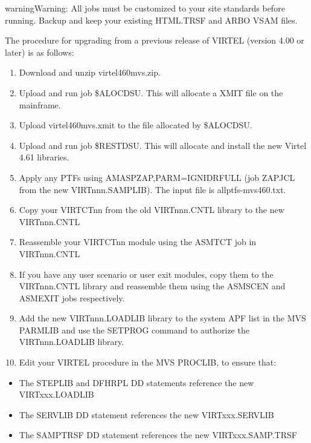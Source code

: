 \documentclass[letterpaper,10pt,english]{sphinxmanual}
\begin{document}
\begin{sphinxadmonition}{warning}{Warning:}
All jobs must be customized to your site standards before running. Backup and keep your existing HTML.TRSF and ARBO VSAM files.
\end{sphinxadmonition}

The procedure for upgrading from a previous release of VIRTEL (version 4.00 or later) is as follows:
\begin{enumerate}
\def\theenumi{\arabic{enumi}}
\def\labelenumi{\theenumi .}
\makeatletter\def\p@enumii{\p@enumi \theenumi .}\makeatother
\item {} 
Download and unzip virtel460mvs.zip.

\item {} 
Upload and run job \$ALOCDSU. This will allocate a XMIT file on the mainframe.

\item {} 
Upload virtel460mvs.xmit to the file allocated by \$ALOCDSU.

\item {} 
Upload and run job \$RESTDSU. This will allocate and install the new Virtel 4.61 libraries.

\item {} 
Apply any PTFs using AMASPZAP,PARM=IGNIDRFULL (job ZAPJCL from the new VIRTnnn.SAMPLIB). The input file is allptfs-mvs460.txt.

\item {} 
Copy your VIRTCTnn from the old VIRTnnn.CNTL library to the new VIRTnnn.CNTL

\item {} 
Reassemble your VIRTCTnn module using the ASMTCT job in VIRTnnn.CNTL

\item {} 
If you have any user scenario or user exit modules, copy them to the VIRTnnn.CNTL library and reassemble them using the ASMSCEN and ASMEXIT jobs respectively.

\item {} 
Add the new VIRTnnn.LOADLIB library to the system APF list in the MVS PARMLIB and use the SETPROG command to authorize the VIRTnnn.LOADLIB library.

\item {} 
Edit your VIRTEL procedure in the MVS PROCLIB, to ensure that:

\end{enumerate}
\begin{itemize}
\item {} 
The STEPLIB and DFHRPL DD statements reference the new VIRTxxx.LOADLIB

\item {} 
The SERVLIB DD statement references the new VIRTxxx.SERVLIB

\item {} 
The SAMPTRSF DD statement references the new VIRTxxx.SAMP.TRSF

\end{itemize}
\end{document}
